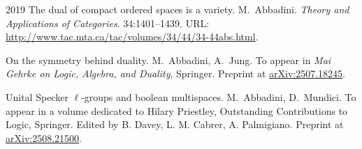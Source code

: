 \pubrow
  {2019}
  {The dual of compact ordered spaces is a variety.}
  {M.\ Abbadini.}
  {\emph{Theory and Applications of Categories}. 34:1401--1439. URL: \url{http://www.tac.mta.ca/tac/volumes/34/44/34-44abs.html}.}


\pubrow
  {}
  {On the symmetry behind duality.}
  {M.\ Abbadini, A.\ Jung.}
  {To appear in \emph{Mai Gehrke on Logic, Algebra, and Duality}, Springer. Preprint at \href{https://arxiv.org/abs/2507.18245}{arXiv:2507.18245}.}

\pubrow
  {}
  {Unital Specker $\ell$-groups and boolean multispaces.}
  {M.\ Abbadini, D.\ Mundici.}
  {To appear in a volume dedicated to Hilary Priestley, Outstanding Contributions to Logic, Springer. Edited by B. Davey, L. M. Cabrer, A. Palmigiano. Preprint at \href{https://arxiv.org/abs/2508.21500}{arXiv:2508.21500}.}


